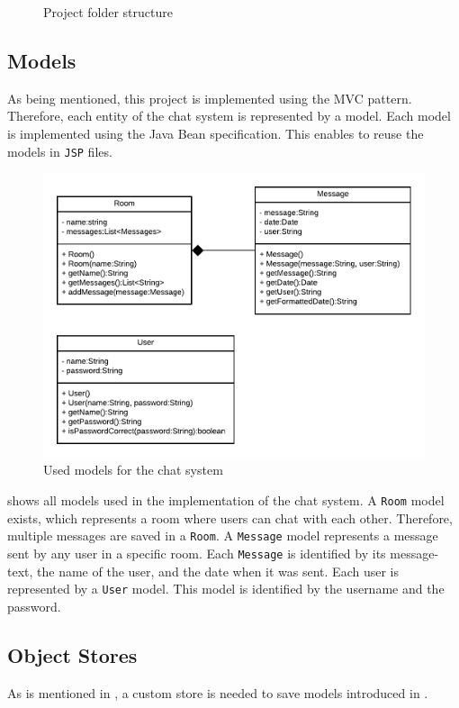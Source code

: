 \begin{figure}[h]
\caption{Project folder structure}
\label{fig:03_impl_structure}
\end{figure}


\subsection{Models}\label{subsec:03_impl_models}
As being mentioned, this project is implemented using the MVC pattern. Therefore, each entity of the chat system is represented by a model.
Each model is implemented using the Java Bean specification. This enables to reuse the models in \texttt{JSP} files.
\begin{figure}[h]
\centering
\includegraphics[scale=0.8]{images/03_impl/models}
\caption{Used models for the chat system}
\label{fig:03_impl_models_models}
\end{figure}
 shows all models used in the implementation of the chat system.
A \texttt{Room} model exists, which represents a room where users can chat with each other. Therefore, multiple messages are saved in a \texttt{Room}. A \texttt{Message} model represents a message sent by any user in a specific room. Each \texttt{Message} is identified by its message-text, the name of the user, and the date when it was sent.
Each user is represented by a \texttt{User} model. This model is identified by the username and the password.


\subsection{Object Stores}\label{subsec:03_impl_objstores}
As is mentioned in , a custom store is needed to save models introduced in .

